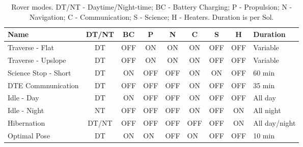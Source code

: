 \begin{table}[h]
\footnotesize
\centering
\caption{Rover modes. DT/NT - Daytime/Night-time; BC - Battery Charging; P - Propulsion; N - Navigation; C - Communication; S - Science; H - Heaters. Duration is per Sol.}
\label{tab:rover-modes}
\begin{tabular}{|l|c|c|c|c|c|c|c|l|}
\hline
\textbf{Name} & \textbf{DT/NT} & \textbf{BC} & \textbf{P} & \textbf{N} & \textbf{C} & \textbf{S} & \textbf{H} & \textbf{Duration} \\ \hline
Traverse - Flat & DT & OFF & ON & ON & ON & OFF & OFF & Variable \\ \hline
Traverse - Upslope & DT & OFF & ON & ON & ON & OFF & OFF & Variable \\ \hline
Science Stop - Short & DT & ON & OFF & OFF & ON & ON & OFF & 60 min \\ \hline
\ac{DTE} Commnunication & DT & OFF & OFF & OFF & ON & OFF & OFF & 35 min \\ \hline
Idle - Day & DT & ON & OFF & OFF & ON & OFF & OFF & All day \\ \hline
Idle - Night & NT & OFF & OFF & OFF & ON & OFF & ON & All night \\ \hline
Hibernation & DT/NT & OFF & OFF & OFF & OFF & OFF & ON & All day/night \\ \hline
Optimal Pose & DT & ON & \multicolumn{1}{l|}{ON} & \multicolumn{1}{l|}{OFF} & \multicolumn{1}{l|}{ON} & \multicolumn{1}{l|}{OFF} & \multicolumn{1}{l|}{OFF} & 10 min \\ \hline
\end{tabular}
\end{table}
